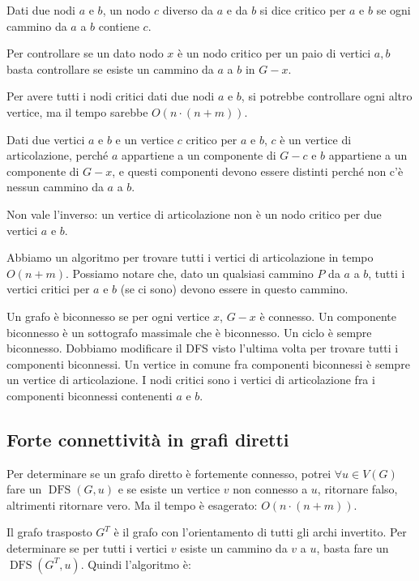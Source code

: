 \begin{defn}
Dati due nodi $a$ e $b$, un nodo $c$ diverso da $a$ e da $b$ si dice critico per $a$ e $b$ se ogni cammino da $a$ a $b$ contiene $c$.
\end{defn}

Per controllare se un dato nodo $x$ \`e un nodo critico per un paio di vertici $a, b$ basta controllare se esiste un cammino da $a$ a $b$ in $G - x$.

Per avere tutti i nodi critici dati due nodi $a$ e $b$, si potrebbe controllare ogni altro vertice, ma il tempo sarebbe $O(n \cdot (n + m))$.

\begin{oss}
Dati due vertici $a$ e $b$ e un vertice $c$ critico per $a$ e $b$, $c$ \`e un vertice di articolazione, perch\'e $a$ appartiene a un componente di $G - c$ e $b$ appartiene a un componente di $G - x$, e questi componenti devono essere distinti perch\'e non c'\`e nessun cammino da $a$ a $b$.
\end{oss}

Non vale l'inverso: un vertice di articolazione non \`e un nodo critico per due vertici $a$ e $b$.

Abbiamo un algoritmo per trovare tutti i vertici di articolazione in tempo $O(n + m)$. Possiamo notare che, dato un qualsiasi cammino $P$ da $a$ a $b$, tutti i vertici critici per $a$ e $b$ (se ci sono) devono essere in questo cammino.

Un grafo \`e biconnesso se per ogni vertice $x$, $G - x$ \`e connesso. Un componente biconnesso \`e un sottografo massimale che \`e biconnesso. Un ciclo \`e sempre biconnesso. Dobbiamo modificare il DFS visto l'ultima volta per trovare tutti i componenti biconnessi. Un vertice in comune fra componenti biconnessi \`e sempre un vertice di articolazione. I nodi critici sono i vertici di articolazione fra i componenti biconnessi contenenti $a$ e $b$.

\subsection{Forte connettivit\`a in grafi diretti}

Per determinare se un grafo diretto \`e fortemente connesso, potrei $\forall u \in V (G)$ fare un $\operatorname{DFS}(G,u)$ e se esiste un vertice $v$ non connesso a $u$, ritornare falso, altrimenti ritornare vero. Ma il tempo \`e esagerato: $O(n \cdot (n + m))$.

Il grafo trasposto $G^T$ \`e il grafo con l'orientamento di tutti gli archi invertito. Per determinare se per tutti i vertici $v$ esiste un cammino da $v$ a $u$, basta fare un $\operatorname{DFS}(G^T, u)$. Quindi l'algoritmo \`e:


